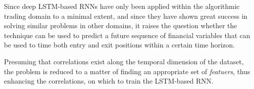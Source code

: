 Since deep LSTM-based RNNs have only been applied within the algorithmic trading domain to a minimal extent, and since they have shown great success in solving similar problems in other domains, it raises the question whether the technique can be used to predict a future sequence of financial variables that can be used to time both entry and exit positions within a certain time horizon.

Presuming that correlations exist along the temporal dimension of the dataset, the problem is reduced to a matter of finding an appropriate set of \textit{featuers}, thus enhancing the correlations, on which to train the LSTM-based RNN.
